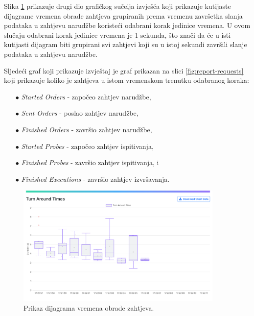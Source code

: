 \documentclass[times, utf8, diplomski]{fer}
\begin{document}
Slika \ref{fig:report-tat} prikazuje drugi dio grafičkog sučelja izvješća koji prikazuje kutijaste dijagrame  vremena obrade zahtjeva grupiranih prema vremenu završetka slanja podataka u zahtjevu narudžbe koristeći odabrani korak jedinice vremena. U ovom slučaju odabrani korak jedinice vremena je 1 sekunda, što znači da će u isti kutijasti dijagram biti grupirani svi zahtjevi koji su u istoj sekundi završili slanje podataka u zahtjevu narudžbe. 

Sljedeći graf koji prikazuje izvještaj je graf prikazan na slici \ref{fig:report-requests} koji prikazuje koliko je zahtjeva u istom vremenskom trenutku odabranog koraka:
\begin{itemize}
    \item[$\bullet$] \textit{Started Orders} - započeo zahtjev narudžbe,
    \item[$\bullet$] \textit{Sent Orders} - poslao zahtjev narudžbe,
    \item[$\bullet$] \textit{Finished Orders} - završio zahtjev narudžbe,
    \item[$\bullet$] \textit{Started Probes} - započeo zahtjev ispitivanja,
    \item[$\bullet$] \textit{Finished Probes} - završio zahtjev ispitivanja, i
    \item[$\bullet$] \textit{Finished Executions} - završio zahtjev izvršavanja.
\end{itemize}

\pagebreak

\begin{figure}[htb]
	\centering
	\includegraphics[width=0.91\textwidth]{images/Report UI 2.png}
	\caption{
		Prikaz dijagrama vremena obrade zahtjeva.
	}
	\label{fig:report-tat}
\end{figure}
\end{document}
